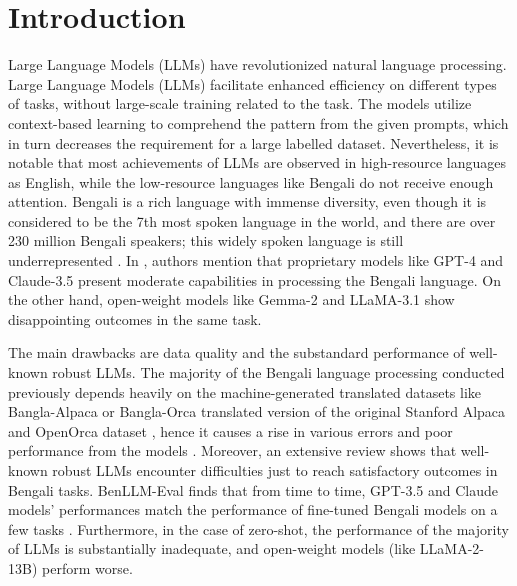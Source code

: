 \documentclass[10pt,letterpaper]{article}
\begin{document}

\linenumbers

\section*{Introduction}
Large Language Models (LLMs) have revolutionized natural language processing. Large Language Models (LLMs) facilitate enhanced efficiency on different types of tasks, without large-scale training related to the task. The models utilize context-based learning to comprehend the pattern from the given prompts, which in turn decreases the requirement for a large labelled dataset. Nevertheless, it is notable that most achievements of LLMs are observed in high-resource languages as English, while the low-resource languages like Bengali do not receive enough attention. Bengali is a rich language with immense diversity, even though it is considered to be the 7th most spoken language in the world, and there are over 230 million Bengali speakers; this widely spoken language is still underrepresented \cite{b45}. In \cite{b10,b29}, authors mention that proprietary models like GPT-4 and Claude-3.5 present moderate capabilities in processing the Bengali language. On the other hand, open-weight models like Gemma-2 and LLaMA-3.1 show disappointing outcomes in the same task.

The main drawbacks are data quality and the substandard performance of well-known robust LLMs. The majority of the Bengali language processing conducted previously depends heavily on the machine-generated translated datasets like Bangla-Alpaca or Bangla-Orca translated version of the original Stanford Alpaca and OpenOrca dataset \cite{b48}, hence it causes a rise in various errors and poor performance from the models \cite{b28}. Moreover, an extensive review shows that well-known robust LLMs encounter difficulties just to reach satisfactory outcomes in Bengali tasks. BenLLM-Eval finds that from time to time, GPT-3.5 and Claude models’ performances match the performance of fine-tuned Bengali models on a few tasks \cite{b3}. Furthermore, in the case of zero-shot, the performance of the majority of LLMs is substantially inadequate, and open-weight models (like LLaMA-2-13B) perform worse.
\end{document}
